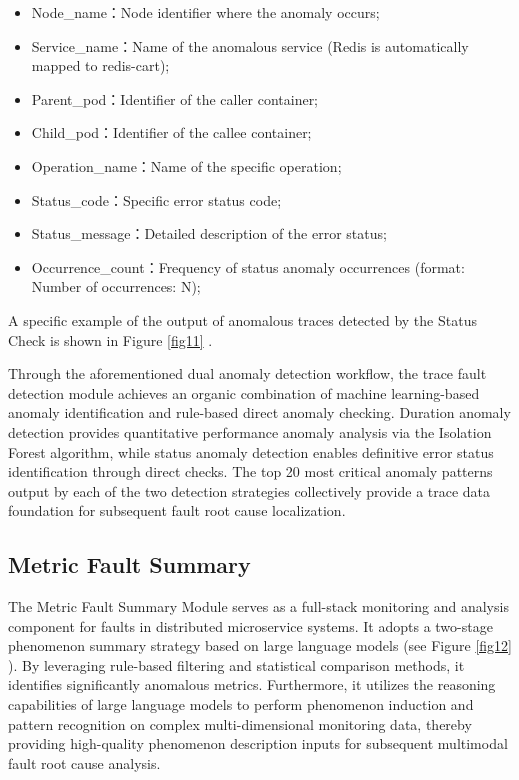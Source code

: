 \documentclass[10pt]{article}
\let\oldref\ref
\renewcommand{\ref}[1]{%
    \textcolor{blue}{\oldref{#1}}%
}
\begin{document}
\begin{itemize}
    \item Node\_name：Node identifier where the anomaly occurs;
    \item Service\_name：Name of the anomalous service (Redis is automatically mapped to redis-cart);
    \item Parent\_pod：Identifier of the caller container;
    \item Child\_pod：Identifier of the callee container;
    \item Operation\_name：Name of the specific operation;
    \item Status\_code：Specific error status code;
    \item Status\_message：Detailed description of the error status;
    \item Occurrence\_count：Frequency of status anomaly occurrences (format: Number of occurrences: N);
\end{itemize}

A specific example of the output of anomalous traces detected by the Status Check is shown in Figure \ref{fig11}.

Through the aforementioned dual anomaly detection workflow, the trace fault detection module achieves an organic combination of machine learning-based anomaly identification and rule-based direct anomaly checking. Duration anomaly detection provides quantitative performance anomaly analysis via the Isolation Forest algorithm, while status anomaly detection enables definitive error status identification through direct checks. The top 20 most critical anomaly patterns output by each of the two detection strategies collectively provide a trace data foundation for subsequent fault root cause localization.

\subsection{Metric Fault Summary}

The Metric Fault Summary Module serves as a full-stack monitoring and analysis component for faults in distributed microservice systems. It adopts a two-stage phenomenon summary strategy based on large language models (see Figure \ref{fig12}). By leveraging rule-based filtering and statistical comparison methods, it identifies significantly anomalous metrics. Furthermore, it utilizes the reasoning capabilities of large language models to perform phenomenon induction and pattern recognition on complex multi-dimensional monitoring data, thereby providing high-quality phenomenon description inputs for subsequent multimodal fault root cause analysis.
\end{document}
